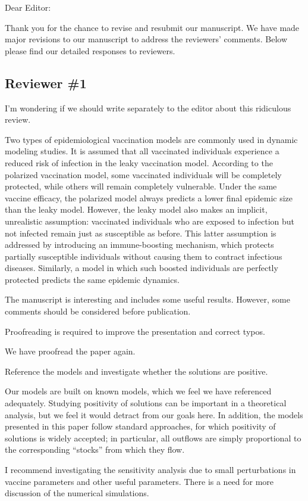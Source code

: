 \documentclass[12pt]{article}
\newcommand{\rev}{\subsection*}
\newcommand{\revtext}{\textsf}
\begin{document}
\noindent Dear Editor:

Thank you for the chance to revise and resubmit our manuscript. 
We have made major revisions to our manuscript to address the reviewers' comments.
Below please find our detailed responses to reviewers.

\rev{Reviewer \#1}

I'm wondering if we should write separately to the editor about this ridiculous review.

\revtext{Two types of epidemiological vaccination models are commonly used in dynamic modeling studies. It is assumed that all vaccinated individuals experience a reduced risk of infection in the leaky vaccination model. According to the polarized vaccination model, some vaccinated individuals will be completely protected, while others will remain completely vulnerable. Under the same vaccine efficacy, the polarized model always predicts a lower final epidemic size than the leaky model. However, the leaky model also makes an implicit, unrealistic assumption: vaccinated individuals who are exposed to infection but not infected remain just as susceptible as before. This latter assumption is addressed by introducing an immune-boosting mechanism, which protects partially susceptible individuals without causing them to contract infectious diseases. Similarly, a model in which such boosted individuals are perfectly protected predicts the same epidemic dynamics.}

\revtext{The manuscript is interesting and includes some useful results. However, some comments should be considered before publication.}

\revtext{Proofreading is required to improve the presentation and correct typos.}

We have proofread the paper again.

\revtext{Reference the models and investigate whether the solutions are positive.}

Our models are built on known models, which we feel we have referenced adequately.
Studying positivity of solutions can be important in a theoretical analysis, but we feel it would detract from our goals here.
In addition, the models presented in this paper follow standard approaches, for which positivity of solutions is widely accepted; in particular, all outflows are simply proportional to the corresponding “stocks” from which they flow.

\revtext{I recommend investigating the sensitivity analysis due to small perturbations in vaccine parameters and other useful parameters. There is a need for more discussion of the numerical simulations.}
\end{document}
